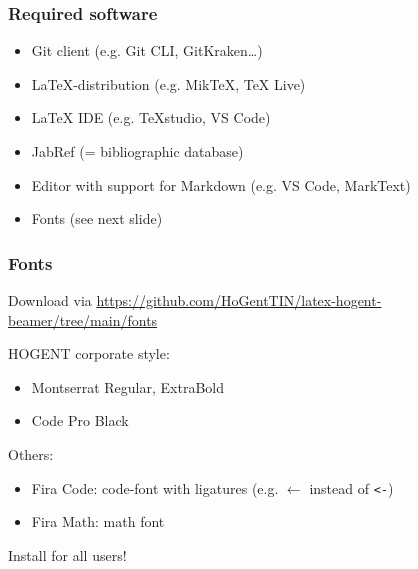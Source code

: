 \documentclass[aspectratio=169]{beamer}
\begin{document}
\begin{frame}
  \frametitle{Required software}


  \begin{itemize}
    \item Git client (e.g. Git CLI, GitKraken\ldots)
    \item \LaTeX-distribution (e.g. MikTeX, TeX Live)
    \item {\LaTeX} IDE (e.g. {\TeX}studio, VS Code)
    \item JabRef (= bibliographic database)
    \item Editor with support for Markdown (e.g. VS Code, MarkText)
    \item Fonts (see next slide)
  \end{itemize}

\end{frame}

\begin{frame}[fragile]
  \frametitle{Fonts}

  Download via \url{https://github.com/HoGentTIN/latex-hogent-beamer/tree/main/fonts}

  \bigskip

  HOGENT corporate style:

  \begin{itemize}
    \item Montserrat Regular, ExtraBold
    \item Code Pro Black
  \end{itemize}

  Others:

  \begin{itemize}
    \item Fira Code: code-font with ligatures (e.g. \({\leftarrow}\) instead of \verb|<-|)
    \item Fira Math: math font
  \end{itemize}

  Install for all users!
\end{frame}
\end{document}
